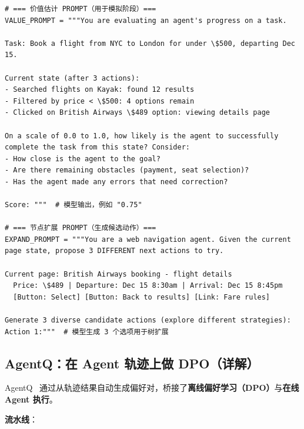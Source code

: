 \begin{examplebox}
\begin{lstlisting}[style=pythonstyle]
# === 价值估计 PROMPT（用于模拟阶段）===
VALUE_PROMPT = """You are evaluating an agent's progress on a task.

Task: Book a flight from NYC to London for under \$500, departing Dec 15.

Current state (after 3 actions):
- Searched flights on Kayak: found 12 results
- Filtered by price < \$500: 4 options remain
- Clicked on British Airways \$489 option: viewing details page

On a scale of 0.0 to 1.0, how likely is the agent to successfully
complete the task from this state? Consider:
- How close is the agent to the goal?
- Are there remaining obstacles (payment, seat selection)?
- Has the agent made any errors that need correction?

Score: """  # 模型输出，例如 "0.75"

# === 节点扩展 PROMPT（生成候选动作）===
EXPAND_PROMPT = """You are a web navigation agent. Given the current
page state, propose 3 DIFFERENT next actions to try.

Current page: British Airways booking - flight details
  Price: \$489 | Departure: Dec 15 8:30am | Arrival: Dec 15 8:45pm
  [Button: Select] [Button: Back to results] [Link: Fare rules]

Generate 3 diverse candidate actions (explore different strategies):
Action 1:"""  # 模型生成 3 个选项用于树扩展
\end{lstlisting}
\end{examplebox}

\subsection{AgentQ：在 Agent 轨迹上做 DPO（详解）}
\label{agentq-dpo-on-agent-trajectories-detailed}

AgentQ~\cite{putta2024agentq} 通过从轨迹结果自动生成偏好对，桥接了\textbf{离线偏好学习（DPO）}与\textbf{在线 Agent 执行}。

\textbf{流水线}：

